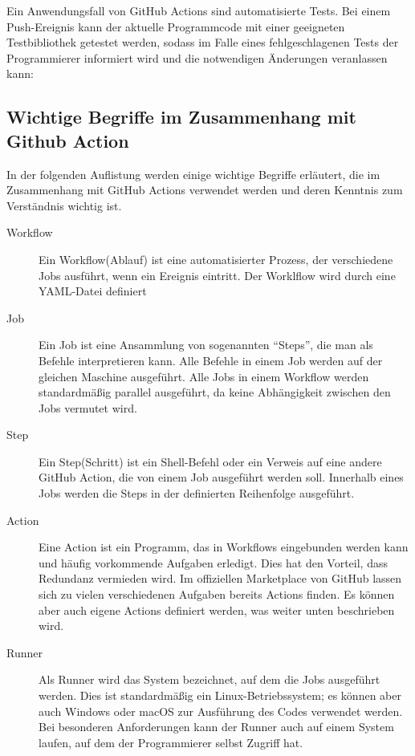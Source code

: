 Ein Anwendungsfall von GitHub Actions sind automatisierte Tests. Bei einem Push-Ereignis kann der aktuelle Programmcode mit einer geeigneten Testbibliothek getestet werden, sodass im Falle eines fehlgeschlagenen Tests der Programmierer informiert wird und die notwendigen Änderungen veranlassen kann: 

\subsection{Wichtige Begriffe im Zusammenhang mit Github Action}
In der folgenden Auflistung werden einige wichtige Begriffe erläutert, die im Zusammenhang mit GitHub Actions verwendet werden und deren Kenntnis zum Verständnis wichtig ist. 
\begin{description}
    \item[Workflow] Ein Workflow(Ablauf) ist eine automatisierter Prozess, der verschiedene Jobs ausführt, wenn ein Ereignis eintritt. Der Worklflow wird durch eine YAML-Datei definiert
    \item[Job] Ein Job ist eine Ansammlung von sogenannten \enquote{Steps}, die man als Befehle interpretieren kann. Alle Befehle in einem Job werden auf der gleichen Maschine ausgeführt. Alle Jobs in einem Workflow werden standardmäßig parallel ausgeführt, da keine Abhängigkeit zwischen den Jobs vermutet wird.
    \item[Step] Ein Step(Schritt) ist ein Shell-Befehl oder ein Verweis auf eine andere GitHub Action, die von einem Job ausgeführt werden soll. Innerhalb eines Jobs werden die Steps in der definierten Reihenfolge ausgeführt. 
    \item[Action] Eine Action ist ein Programm, das in Workflows eingebunden werden kann und häufig vorkommende Aufgaben erledigt. Dies hat den Vorteil, dass Redundanz vermieden wird. Im offiziellen Marketplace von GitHub lassen sich zu vielen verschiedenen Aufgaben bereits Actions finden. Es können aber auch eigene Actions definiert werden, was weiter unten beschrieben wird. 
    \item[Runner] Als Runner wird das System bezeichnet, auf dem die Jobs ausgeführt werden. Dies ist standardmäßig ein Linux-Betriebssystem; es können aber auch Windows oder macOS zur Ausführung des Codes verwendet werden. Bei besonderen Anforderungen kann der Runner auch auf einem System laufen, auf dem der Programmierer selbst Zugriff hat.
\end{description}

